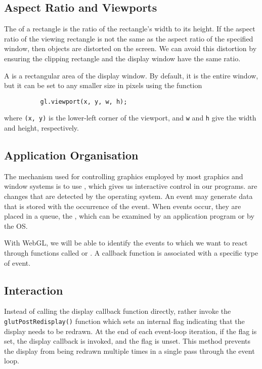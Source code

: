 \documentclass[../notes.tex]{subfiles}
\begin{document}
      \subsection{Aspect Ratio and Viewports}
        The  of a rectangle is the ratio of the rectangle's
        width to its height.
        If the aspect ratio of the viewing rectangle is not the same as the aspect ratio
        of the specified window, then objects are distorted on the screen.
        We can avoid this distortion by ensuring the clipping rectangle and the display window
        have the same ratio.

        A  is a rectangular area of the display window.
        By default, it is the entire window, but it can be set to any smaller size in pixels
        using the function
        \begin{verbatim}
          gl.viewport(x, y, w, h);
        \end{verbatim}
        where \texttt{(x, y)} is the lower-left corner of the viewport,
        and \texttt{w} and \texttt{h} give the width and height, respectively.

      \subsection{Application Organisation}
        The mechanism used for controlling graphics employed by most graphics and window systems
        is to use , which gives us interactive control in our programs.
         are changes that are detected by the operating system.
        An event may generate data that is stored with the occurrence of the event.
        When events occur, they are placed in a queue, the ,
        which can be examined by an application program or by the OS.

        With WebGL, we will be able to identify the events to which we want to react through
        functions called  or .
        A callback function is associated with a specific type of event.

      \pagebreak

      \subsection{Interaction}
        Instead of calling the display callback function directly, rather invoke the
        \texttt{glutPostRedisplay()} function which sets an internal flag
        indicating that the display needs to be redrawn.
        At the end of each event-loop iteration, if the flag is set, the display callback is invoked,
        and the flag is unset.
        This method prevents the display from being redrawn multiple times in a single pass through
        the event loop.
\end{document}
